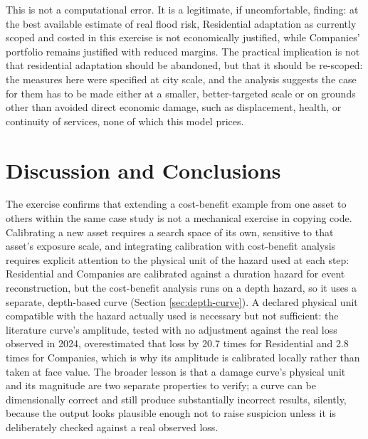 \documentclass[11pt]{article}
\begin{document}
This is not a computational error. It is a legitimate, if uncomfortable, finding: at the
best available estimate of real flood risk, Residential adaptation as currently scoped and
costed in this exercise is not economically justified, while Companies' portfolio remains
justified with reduced margins. The practical implication is not that residential adaptation
should be abandoned, but that it should be re-scoped: the measures here were specified at
city scale, and the analysis suggests the case for them has to be made either at a smaller,
better-targeted scale or on grounds other than avoided direct economic damage, such as
displacement, health, or continuity of services, none of which this model prices.

\section{Discussion and Conclusions}

The exercise confirms that extending a cost-benefit example from one asset to others within
the same case study is not a mechanical exercise in copying code. Calibrating a new asset
requires a search space of its own, sensitive to that asset's exposure scale, and
integrating calibration with cost-benefit analysis requires explicit attention to the
physical unit of the hazard used at each step: Residential and Companies are calibrated
against a duration hazard for event reconstruction, but the cost-benefit analysis runs on a
depth hazard, so it uses a separate, depth-based curve (Section \ref{sec:depth-curve}). A
declared physical unit compatible with the hazard actually used is necessary but not
sufficient: the literature curve's amplitude, tested with no adjustment against the real
loss observed in 2024, overestimated that loss by 20.7 times for Residential and 2.8 times
for Companies, which is why its amplitude is calibrated locally rather than taken at face
value. The broader lesson is that a damage curve's physical unit and its magnitude are two
separate properties to verify; a curve can be dimensionally correct and still produce
substantially incorrect results, silently, because the output looks plausible enough not to
raise suspicion unless it is deliberately checked against a real observed loss.
\end{document}
